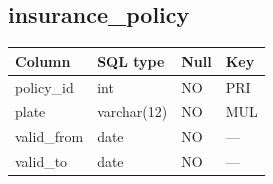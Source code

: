 \documentclass[11pt,a4paper]{article}
\begin{document}
\subsection*{insurance\_\allowbreak{}policy}
\par\begingroup\small\noindent
\begin{tabularx}{\linewidth}{p{4.4cm}p{4.0cm}p{1.5cm}X}
\toprule
Column & SQL type & Null & Key\\\midrule
policy\_\allowbreak{}id & int & NO & PRI\\
plate & varchar(12) & NO & MUL\\
valid\_\allowbreak{}from & date & NO & —\\
valid\_\allowbreak{}to & date & NO & —\\
\bottomrule
\end{tabularx}
\par\endgroup
\end{document}
